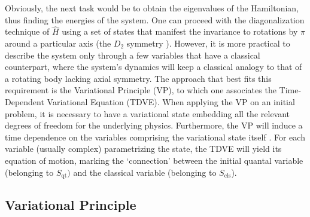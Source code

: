 Obviously, the next task would be to obtain the eigenvalues of the Hamiltonian, thus finding the energies of the system. One can proceed with the diagonalization technique of $\hat{H}$ using a set of states that manifest the invariance to rotations by $\pi$ around a particular axis (the $D_2$ symmetry \cite{bohr1998nuclear}). However, it is more practical to describe the system only through a few variables that have a classical counterpart, where the system's dynamics will keep a classical analogy to that of a rotating body lacking axial symmetry. The approach that best fits this requirement is the Variational Principle (VP), to which one associates the Time-Dependent Variational Equation (TDVE). When applying the VP on an initial problem, it is necessary to have a variational state embedding all the relevant degrees of freedom for the underlying physics. Furthermore, the VP will induce a time dependence on the variables comprising the variational state itself \cite{budaca2018tilted}. For each variable (usually complex) parametrizing the state, the TDVE will yield its equation of motion, marking the `connection' between the initial quantal variable (belonging to $S_\text{qt})$ and the classical variable (belonging to $S_\text{cls}$).

\subsection{Variational Principle}

